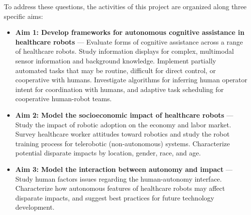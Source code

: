To address these questions, the activities of this project are organized along three specific aims:

\begin{itemize}
\item \textbf{Aim 1: Develop frameworks for autonomous cognitive assistance in healthcare robots} --- Evaluate forms of cognitive assistance across a range of healthcare robots.  Study information displays for complex, multimodal sensor information and background knowledge.  Implement partially automated tasks that may be routine, difficult for direct control, or cooperative with humans.  Investigate algorithms for inferring human operator intent for coordination with humans, and adaptive task scheduling for cooperative human-robot teams.

\item \textbf{Aim 2: Model the socioeconomic impact of healthcare robots} --- Study the impact of robotic adoption on the economy and labor market.  Survey healthcare worker attitudes toward robotics and study the robot training process for telerobotic (non-autonomous) systems.  Characterize potential disparate impacts by location, gender, race, and age. 

\item \textbf{Aim 3: Model the interaction between autonomy and impact} --- Study human factors issues regarding the human-autonomy interface.  Characterize how autonomous features of healthcare robots may affect disparate impacts, and suggest best practices for future technology development.




\end{itemize}
